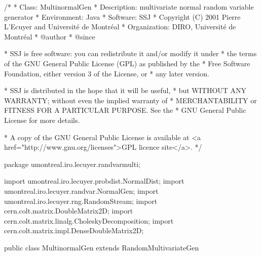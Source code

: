 \begin{code}
\begin{hide}
/*
 * Class:        MultinormalGen
 * Description:  multivariate normal random variable generator
 * Environment:  Java
 * Software:     SSJ 
 * Copyright (C) 2001  Pierre L'Ecuyer and Université de Montréal
 * Organization: DIRO, Université de Montréal
 * @author       
 * @since

 * SSJ is free software: you can redistribute it and/or modify it under
 * the terms of the GNU General Public License (GPL) as published by the
 * Free Software Foundation, either version 3 of the License, or
 * any later version.

 * SSJ is distributed in the hope that it will be useful,
 * but WITHOUT ANY WARRANTY; without even the implied warranty of
 * MERCHANTABILITY or FITNESS FOR A PARTICULAR PURPOSE.  See the
 * GNU General Public License for more details.

 * A copy of the GNU General Public License is available at
   <a href="http://www.gnu.org/licenses">GPL licence site</a>.
 */
\end{hide}
package umontreal.iro.lecuyer.randvarmulti;
\begin{hide}
import umontreal.iro.lecuyer.probdist.NormalDist;
import umontreal.iro.lecuyer.randvar.NormalGen;
import umontreal.iro.lecuyer.rng.RandomStream;
import cern.colt.matrix.DoubleMatrix2D;
import cern.colt.matrix.linalg.CholeskyDecomposition;
import cern.colt.matrix.impl.DenseDoubleMatrix2D;
\end{hide}

public class MultinormalGen extends RandomMultivariateGen\begin{hide} {
   protected double[] mu;
   protected DoubleMatrix2D sigma;
   protected DoubleMatrix2D sqrtSigma;
   protected double[] temp;
   protected static final double MYINF = 37.54;


   private void initMN (NormalGen gen1, double[] mu, int d) {
      if (gen1 == null)
         throw new NullPointerException ("gen1 is null");

      NormalDist dist = (NormalDist) gen1.getDistribution();
      if (dist.getMu() != 0.0)
         throw new IllegalArgumentException ("mu != 0");
      if (dist.getSigma() != 1.0)
         throw new IllegalArgumentException ("sigma != 1");
      this.gen1 = gen1;
      dist = null;

      if (mu == null) {    // d is the dimension
         dimension = d;
         this.mu = new double[d];
      } else {      // d is unused
         dimension = mu.length;
         this.mu = (double[])mu.clone();
      }
      temp = new double[dimension];
     }\end{hide}\end{code}

